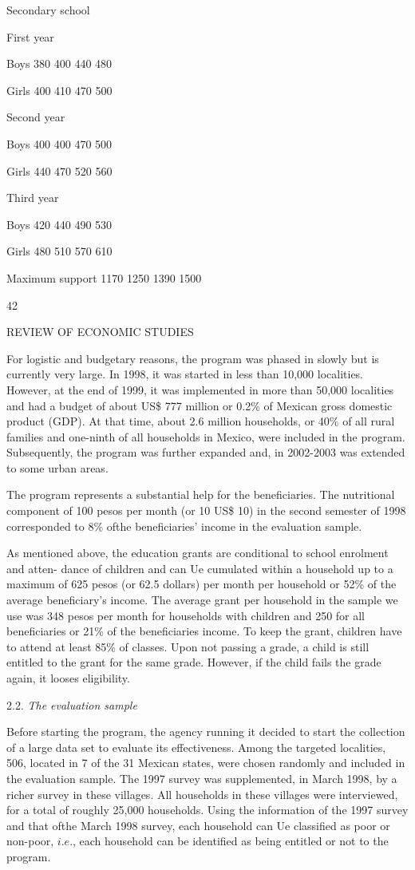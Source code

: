 Secondary school

First year

Boys 380 400 440 480

Girls 400 410 470 500

Second year

Boys 400 400 470 500

Girls 440 470 520 560

Third year

Boys 420 440 490 530

Girls 480 510 570 610

Maximum support 1170 1250 1390 1500

42

REVIEW OF ECONOMIC STUDIES

For logistic and budgetary reasons, the program was phased in slowly but is currently very large. In 1998, it was started in less than 10,000 localities. However, at the end of 1999, it was implemented in more than 50,000 localities and had a budget of about US{\$} 777 million or 0.2\% of Mexican gross domestic product (GDP). At that time, about 2.6 million households, or 40\% of all rural families and one-ninth of all households in Mexico, were included in the program. Subsequently, the program was further expanded and, in 2002-2003 was extended to some urban areas.

The program represents a substantial help for the beneficiaries. The nutritional component of 100 pesos per month (or 10 US{\$} 10) in the second semester of 1998 corresponded to 8\% ofthe beneficiaries' income in the evaluation sample.

As mentioned above, the education grants are conditional to school enrolment and atten- dance of children and can Ue cumulated within a household up to a maximum of 625 pesos (or 62.5 dollars) per month per household or 52\% of the average beneficiary's income. The average grant per household in the sample we use was 348 pesos per month for households with children and 250 for all beneficiaries or 21\% of the beneficiaries income. To keep the grant, children have to attend at least 85\% of classes. Upon not passing a grade, a child is still entitled to the grant for the same grade. However, if the child fails the grade again, it looses eligibility.

2.2. {\it The evaluation sample}

Before starting the program, the agency running it decided to start the collection of a large data set to evaluate its effectiveness. Among the targeted localities, 506, located in 7 of the 31 Mexican states, were chosen randomly and included in the evaluation sample. The 1997 survey was supplemented, in March 1998, by a richer survey in these villages. All households in these villages were interviewed, for a total of roughly 25,000 households. Using the information of the 1997 survey and that ofthe March 1998 survey, each household can Ue classified as poor or non-poor, $i.e$., each household can be identified as being entitled or not to the program.

